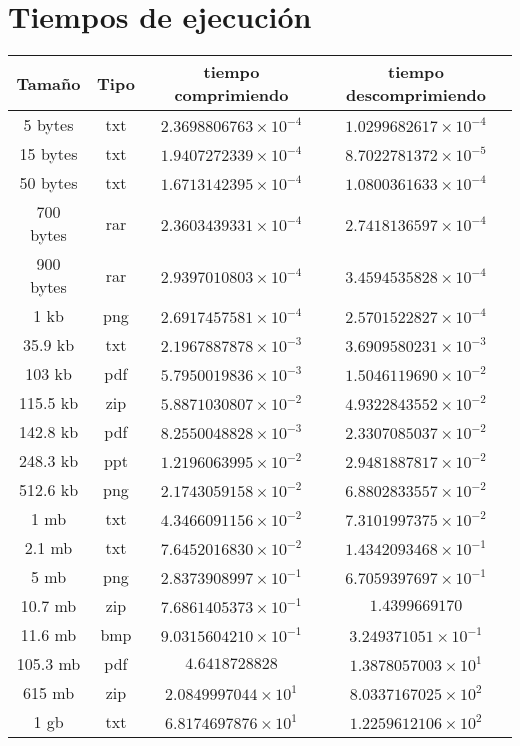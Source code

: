 \documentclass[12 pt]{report}
\begin{document}
\section{Tiempos de ejecución}
\begin{tabular}{ || c c | c | c || }
  \hline
  Tamaño & Tipo & tiempo comprimiendo & tiempo descomprimiendo  \\[0.5ex]
  \hline \hline
  5 bytes & txt & $2.3698806763\times10^{-4}$ & $1.0299682617\times10^{-4}$\\
  15 bytes & txt & $1.9407272339\times10^{-4}$ & $8.7022781372\times10^{-5}$\\
  50 bytes & txt & $1.6713142395\times10^{-4}$ & $1.0800361633\times10^{-4}$\\
  700 bytes & rar & $2.3603439331\times10^{-4}$ & $2.7418136597\times10^{-4}$\\
  900 bytes & rar & $2.9397010803\times10^{-4}$ & $3.4594535828\times10^{-4}$\\
  1 kb & png & $2.6917457581\times10^{-4}$ & $2.5701522827\times10^{-4}$\\
  35.9 kb & txt & $2.1967887878\times10^{-3}$ & $3.6909580231\times10^{-3}$\\
  103 kb & pdf & $5.7950019836\times10^{-3}$ & $1.5046119690\times10^{-2}$\\
  115.5 kb & zip & $ 5.8871030807\times10^{-2}$ & $4.9322843552\times10^{-2}$\\
  142.8 kb & pdf & $8.2550048828\times10^{-3}$ & $2.3307085037\times10^{-2}$\\
  248.3 kb & ppt & $1.2196063995\times10^{-2}$ & $2.9481887817\times10^{-2}$\\
  512.6 kb & png & $2.1743059158\times10^{-2}$ & $6.8802833557\times10^{-2}$\\
  1 mb & txt &  $4.3466091156\times10^{-2}$ & $7.3101997375\times10^{-2}$\\
  2.1 mb & txt & $7.6452016830\times10^{-2}$ & $1.4342093468\times10^{-1}$\\
  5 mb & png & $2.8373908997\times10^{-1}$ & $6.7059397697\times10^{-1}$\\
  10.7 mb & zip & $7.6861405373\times10^{-1}$ & $1.4399669170$\\
  11.6 mb & bmp & $9.0315604210\times10^{-1}$ & $3.249371051\times10^{-1}$\\
  105.3 mb & pdf & $4.6418728828$ & $1.3878057003\times10^{1}$\\
  615 mb & zip &  $2.0849997044\times10^{1}$ & $8.0337167025\times10^{2}$ \\
  1 gb & txt & $6.8174697876\times10^{1}$ & $1.2259612106\times10^{2}$ \\
  [1ex]
  \hline
\end{tabular}
\end{document}
